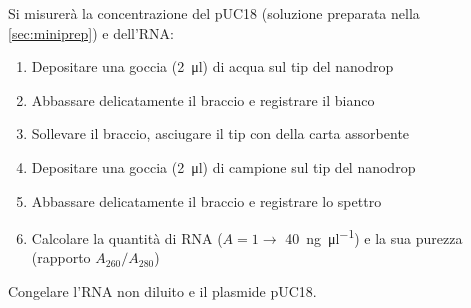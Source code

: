 \noindent Si misurerà la concentrazione del pUC18 (soluzione preparata nella \autoref{sec:miniprep}) e dell'RNA:
\begin{enumerate}
	\item Depositare una goccia (\qty{2}{\micro\litre}) di acqua sul tip del nanodrop
	\item Abbassare delicatamente il braccio e registrare il bianco
	\item Sollevare il braccio, asciugare il tip con della carta assorbente
	\item Depositare una goccia (\qty{2}{\micro\litre}) di campione sul tip del nanodrop
	\item Abbassare delicatamente il braccio e registrare lo spettro
	\item Calcolare la quantità di RNA (\(A=1\to\) \qty{40}{\ng\per\micro\litre}) e la sua purezza (rapporto \(A_{260}/A_{280}\))
\end{enumerate}
Congelare l'RNA non diluito e il plasmide pUC18.





\begingroup
\newpage
{}

\vspace{0.5cm}

\vspace{0.5cm}
\endgroup
